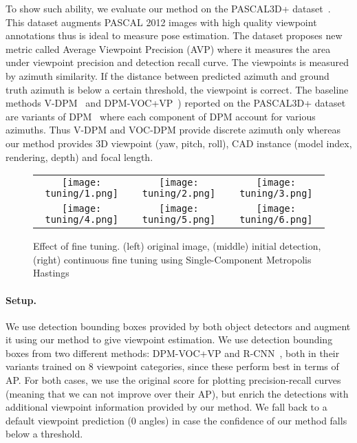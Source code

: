 To show such ability, we evaluate our method on the PASCAL3D+
dataset~\cite{Xiang14}. This dataset augments PASCAL 2012 images with
high quality viewpoint annotations thus is ideal to measure pose
estimation. The dataset proposes new metric called Average Viewpoint
Precision (AVP) where it measures the area under viewpoint precision
and detection recall curve. The viewpoints is measured by azimuth
similarity. If the distance between predicted azimuth and ground truth
azimuth is below a certain threshold, the viewpoint is correct.
The baseline methods V-DPM~\cite{Xiang14} and
DPM-VOC+VP~\cite{Pepik12}) reported on the PASCAL3D+ dataset are
variants of DPM~\cite{Felzenszwalb10} where each component of DPM
account for various azimuths. Thus V-DPM and VOC-DPM provide discrete
azimuth only whereas our method provides 3D viewpoint (yaw, pitch,
roll), CAD instance (model index, rendering, depth) and focal length.
%
\begin{figure}[t]
 \begin{center}
    \setlength\tabcolsep{0pt}
    \begin{tabular}{ccc}
   \texttt{[image: tuning/1.png]} &
   \texttt{[image: tuning/2.png]} &
   \texttt{[image: tuning/3.png]} \\[-5pt]
   \texttt{[image: tuning/4.png]} &
   \texttt{[image: tuning/5.png]} &
   \texttt{[image: tuning/6.png]} \\[-5pt]
   \end{tabular}
 \end{center}
 \caption{Effect of fine tuning. (left) original image, (middle) initial detection, (right) continuous fine tuning using Single-Component Metropolis Hastings}
 \label{fig:tuning}
\end{figure}

\paragraph{Setup.}
We use detection bounding boxes provided by both object detectors and
augment it using our method to give viewpoint estimation. We use
detection bounding boxes from two different methods:
DPM-VOC+VP\cite{Pepik12} and R-CNN~\cite{Girshick14}, both in their
variants trained on 8 viewpoint categories, since these perform best
in terms of AP. For both cases,
we use the original score for plotting precision-recall curves
(meaning that we can not improve over their AP), but
enrich the detections with additional viewpoint information provided
by our method. We fall back to a default
viewpoint prediction ($0$ angles) in case the confidence of our
method falls below a threshold.

